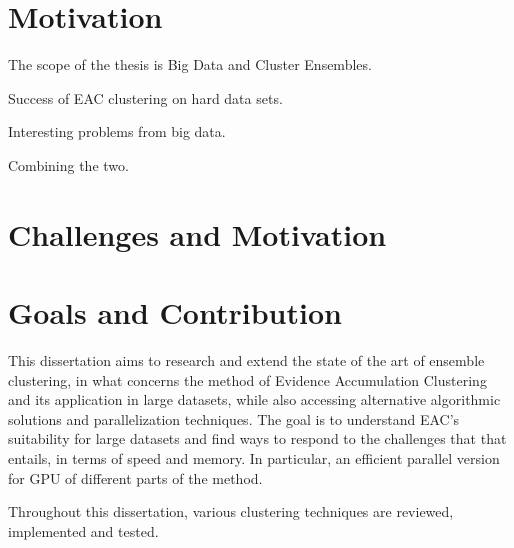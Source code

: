 \section{Motivation}
The scope of the thesis is Big Data and Cluster Ensembles.

Success of EAC clustering on hard data sets.

Interesting problems from big data.

Combining the two.

\section{Challenges and Motivation}

\section{Goals and Contribution}

This dissertation aims to research and extend the state of the art of ensemble clustering, in what concerns the method of Evidence Accumulation Clustering and its application in large datasets, while also accessing alternative algorithmic solutions and parallelization techniques. The goal is to understand EAC's suitability for large datasets and find ways to respond to the challenges that that entails, in terms of speed and memory. In particular, an efficient parallel version for GPU of different parts of the method.

Throughout this dissertation, various clustering techniques are reviewed, implemented and tested. 

